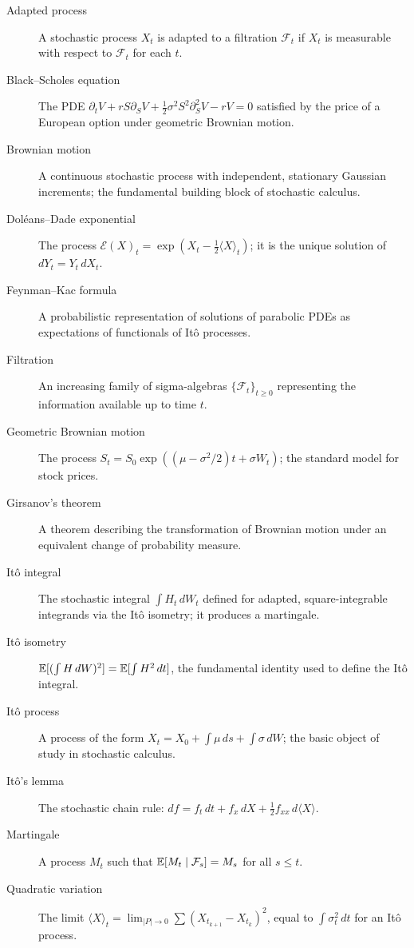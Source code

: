 \begin{description}
    \item[Adapted process] A stochastic process \(X_t\) is adapted to a filtration \(\mathcal{F}_t\) if \(X_t\) is measurable with respect to \(\mathcal{F}_t\) for each \(t\).
    \item[Black--Scholes equation] The PDE \(\partial_t V + rS \partial_S V + \frac12 \sigma^2 S^2 \partial_S^2 V - rV = 0\) satisfied by the price of a European option under geometric Brownian motion.
    \item[Brownian motion] A continuous stochastic process with independent, stationary Gaussian increments; the fundamental building block of stochastic calculus.
    \item[Dol\'eans--Dade exponential] The process \(\mathcal{E}(X)_t = \exp(X_t - \frac12 \langle X\rangle_t)\); it is the unique solution of \(dY_t = Y_t\,dX_t\).
    \item[Feynman--Kac formula] A probabilistic representation of solutions of parabolic PDEs as expectations of functionals of It\^{o} processes.
    \item[Filtration] An increasing family of sigma-algebras \(\{\mathcal{F}_t\}_{t \geq 0}\) representing the information available up to time \(t\).
    \item[Geometric Brownian motion] The process \(S_t = S_0 \exp((\mu - \sigma^2/2)t + \sigma W_t)\); the standard model for stock prices.
    \item[Girsanov's theorem] A theorem describing the transformation of Brownian motion under an equivalent change of probability measure.
    \item[It\^{o} integral] The stochastic integral \(\int H_t\,dW_t\) defined for adapted, square-integrable integrands via the It\^{o} isometry; it produces a martingale.
    \item[It\^{o} isometry] \(\mathbb{E}[(\int H\,dW)^2] = \mathbb{E}[\int H^2\,dt]\), the fundamental identity used to define the It\^{o} integral.
    \item[It\^{o} process] A process of the form \(X_t = X_0 + \int \mu\,ds + \int \sigma\,dW\); the basic object of study in stochastic calculus.
    \item[It\^{o}'s lemma] The stochastic chain rule: \(df = f_t\,dt + f_x\,dX + \frac12 f_{xx}\,d\langle X\rangle\).
    \item[Martingale] A process \(M_t\) such that \(\mathbb{E}[M_t \mid \mathcal{F}_s] = M_s\) for all \(s \leq t\).
    \item[Quadratic variation] The limit \(\langle X\rangle_t = \lim_{|P| \to 0} \sum (X_{t_{k+1}} - X_{t_k})^2\), equal to \(\int \sigma_t^2\,dt\) for an It\^{o} process.

\end{description}
